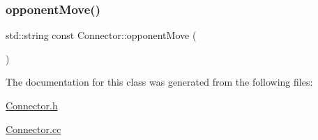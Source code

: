 \mbox{\label{class_connector_ab16b09be62901a7c11f829caac553a17}} 
\subsubsection{\texorpdfstring{opponent\+Move()}{opponentMove()}}
{\footnotesize\ttfamily std\+::string const Connector\+::opponent\+Move (\begin{DoxyParamCaption}{ }\end{DoxyParamCaption})\hspace{0.3cm}{\ttfamily [static]}}



The documentation for this class was generated from the following files\+:\begin{DoxyCompactItemize}
\item 
\hyperlink{_connector_8h}{Connector.\+h}\item 
\hyperlink{_connector_8cc}{Connector.\+cc}\end{DoxyCompactItemize}
